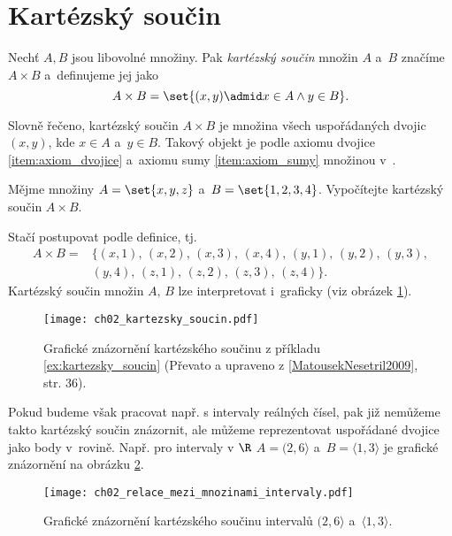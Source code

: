 \section{Kartézský součin}\label{sec:kartezsky_soucin}
\begin{definition}\label{def:kartezsky_soucin}
    Nechť $A,B$ jsou libovolné množiny. Pak \emph{kartézský součin} množin $A$ a~$B$ značíme $A\times B$ a~definujeme jej jako
    \begin{equation*}
        A\times B=\set{(x,y) \admid x\in A \land y\in B}.
    \end{equation*}
\end{definition}
Slovně řečeno, kartézský součin $A\times B$ je množina všech uspořádaných dvojic $(x,y)$, kde $x\in A$ a~$y\in B$. Takový objekt je podle axiomu dvojice \ref{item:axiom_dvojice} a~axiomu sumy \ref{item:axiom_sumy} množinou v~\ZF{}.
\begin{example}\label{ex:kartezsky_soucin}
    Mějme množiny $A=\set{x,y,z}$ a~$B=\set{1,2,3,4}$. Vypočítejte kartézský součin $A\times B$.
\end{example}
\begin{solution}
    Stačí postupovat podle definice, tj.
    \begin{align*}
        A\times B=&\{(x,1),\,(x,2),\,(x,3),\,(x,4),\,(y,1),\,(y,2),\,(y,3),\\
        &(y,4),\,(z,1),\,(z,2),\,(z,3),\,(z,4)\}.
    \end{align*}
    Kartézský součin množin $A,\,B$ lze interpretovat i~graficky (viz obrázek \ref{fig:kartezsky_soucin}).
\end{solution}
\begin{figure}[H]
    \centering
    \texttt{[image: ch02\_kartezsky\_soucin.pdf]}
    \caption{Grafické znázornění kartézského součinu z příkladu \ref{ex:kartezsky_soucin} (Převato a upraveno z \ref{MatousekNesetril2009}, str. 36).}
    \label{fig:kartezsky_soucin}
\end{figure}
Pokud budeme však pracovat např. s intervaly reálných čísel, pak již nemůžeme takto kartézský součin znázornit, ale můžeme reprezentovat uspořádané dvojice jako body v~rovině. Např. pro intervaly v $\R$ $A=(2, 6\rangle$ a~$B=\langle 1,3 \rangle$ je grafické znázornění na obrázku \ref{fig:kartezsky_soucin_intervaly}.
\begin{figure}[H]
    \centering
    \texttt{[image: ch02\_relace\_mezi\_mnozinami\_intervaly.pdf]}
    \caption{Grafické znázornění kartézského součinu intervalů $(2, 6\rangle$ a~$\langle 1,3 \rangle$.}
    \label{fig:kartezsky_soucin_intervaly}
\end{figure}
